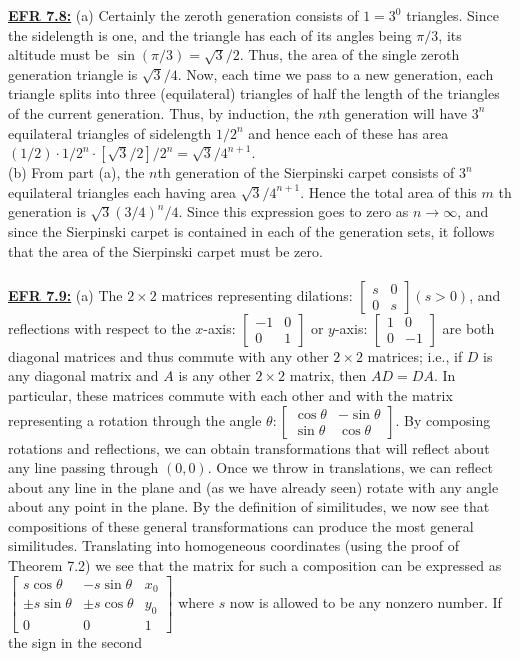 \documentclass[../main.tex]{subfiles}
\begin{document}
\textbf{\underline{EFR 7.8:}} (a) Certainly the zeroth generation consists of $1=3^{0}$ triangles. Since the sidelength is one, and the triangle has each of its angles being $\pi / 3$, its altitude must be $\sin (\pi / 3)=\sqrt{3} / 2$. Thus, the area of the single zeroth generation triangle is $\sqrt{3} / 4$. Now, each time we pass to a new generation, each triangle splits into three (equilateral) triangles of half the length of the triangles of the current generation. Thus, by induction, the $n$th generation will have $3^{n}$ equilateral triangles of sidelength $1 / 2^{n}$ and hence each of these has area $(1 / 2) \cdot 1 / 2^{n} \cdot[\sqrt{3} / 2] / 2^{n}=\sqrt{3} / 4^{n+1}$.\\
(b) From part (a), the $n$th generation of the Sierpinski carpet consists of $3^{n}$ equilateral triangles each having area $\sqrt{3} / 4^{n+1}$. Hence the total area of this $m$ th generation is $\sqrt{3}(3 / 4)^{n} / 4$. Since this expression goes to zero as $n \rightarrow \infty$, and since the Sierpinski carpet is contained in each of the generation sets, it follows that the area of the Sierpinski carpet must be zero.
\\
\\
\textbf{\underline{EFR 7.9:}} (a) The $2 \times 2$ matrices representing dilations: $\left[\begin{array}{ll}s & 0 \\ 0 & s\end{array}\right](s>0)$, and reflections with respect to the $x$-axis: $\left[\begin{array}{cc}-1 & 0 \\ 0 & 1\end{array}\right]$ or $y$-axis: $\left[\begin{array}{cc}1 & 0 \\ 0 & -1\end{array}\right]$ are both diagonal matrices and thus commute with any other $2 \times 2$ matrices; i.e., if $D$ is any diagonal matrix and $A$ is any other $2 \times 2$ matrix, then $A D=D A$. In particular, these matrices commute with each other and with the matrix representing a rotation through the angle $\theta:\left[\begin{array}{rr}\cos \theta & -\sin \theta \\ \sin \theta & \cos \theta\end{array}\right]$. By composing rotations and reflections, we can obtain transformations that will reflect about any line passing through $(0,0)$. Once we throw in translations, we can reflect about any line in the plane and (as we have already seen) rotate with any angle about any point in the plane. By the definition of similitudes, we now see that compositions of these general transformations can produce the most general similitudes. Translating into homogeneous coordinates (using the proof of Theorem 7.2) we see that the matrix for such a composition can be expressed as $\left[\begin{array}{ccc}s \cos \theta & -s \sin \theta & x_{0} \\ \pm s \sin \theta & \pm s \cos \theta & y_{0} \\ 0 & 0 & 1\end{array}\right]$ where $s$ now is allowed to be any nonzero number. If the sign in the second
\end{document}
